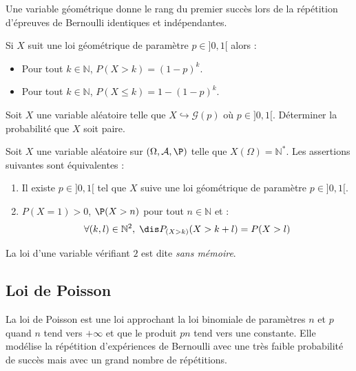 \documentclass[a4paper,10pt]{report}
\begin{document}
\begin{retenir} Une variable  géométrique donne le rang du premier succès lors de la répétition d'épreuves de Bernoulli identiques et indépendantes.
\end{retenir}

\begin{prop}
Si $X$ suit une loi géométrique de paramètre $p \in ]0,1[$ alors :
\begin{itemize}
\item Pour tout $k \in \mathbb{N}$, $P(X>k)=(1-p)^k$.
\item Pour tout $k \in \mathbb{N}$, $P(X \leq k)=1-(1-p)^k$.
\end{itemize}
\end{prop}

\begin{preuve}
\vspace{5cm}
\end{preuve}

\begin{exa} Soit $X$ une variable aléatoire telle que $X \hookrightarrow \mathcal{G}(p)$ où $p \in ]0,1[$. Déterminer la probabilité que $X$ soit paire.
\end{exa}

\begin{prop}
Soit $X$ une variable aléatoire sur $(\Omega, \mathcal{A}, \P)$ telle que $X(\Omega) = \mathbb{N}^*$. Les assertions suivantes sont équivalentes :
\begin{enumerate}
\item Il existe $p \in ]0,1[$ tel que $X$ suive une loi géométrique de paramètre $p \in ]0,1[$.
\item $P(X=1)>0$, $\P(X>n)$ pour tout $n \in \mathbb{N}$ et :
$$ \forall (k,l) \in \mathbb{N}^2, \; \dis P_{(X>k)}(X>k+l)=P(X>l)$$
\end{enumerate}
La loi d'une variable vérifiant $2$ est dite \textit{sans mémoire}.
\end{prop}

\begin{preuve}
\vspace{13cm}
\end{preuve}

\subsection{Loi de Poisson}
\noindent La loi de Poisson est une loi \og approchant \fg la loi binomiale de paramètres $n$ et $p$ quand $n$ tend vers $+ \infty$ et que le produit $pn$ tend vers une constante. Elle modélise la répétition d'expériences de Bernoulli avec une très faible probabilité de succès mais avec un grand nombre de répétitions.
\end{document}
